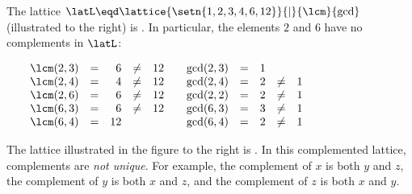 \begin{example}
%
\label{ex:lat_fact12}
The lattice $\latL\eqd\lattice{\setn{1,2,3,4,6,12}}{|}{\lcm}{\gcd}$
(illustrated to the right) is .
In particular,
the elements $2$ and $6$ have no complements in $\latL$:
\\\begin{minipage}[c]{\tw-33mm}
$\begin{array}{@{\qquad}lcrcr @{\qquad} lcrcr}
  \lcm(2,3) &=&  6 &\ne & 12  & \gcd(2,3) &=& 1 &     &    \\
  \lcm(2,4) &=&  4 &\ne & 12  & \gcd(2,4) &=& 2 &\ne & 1  \\
  \lcm(2,6) &=&  6 &\ne & 12  & \gcd(2,2) &=& 2 &\ne & 1  \\
  \lcm(6,3) &=&  6 &\ne & 12  & \gcd(6,3) &=& 3 &\ne & 1  \\
  \lcm(6,4) &=& 12 &     &     & \gcd(6,4) &=& 2 &\ne & 1  \\
\end{array}$
\end{minipage}%
\hfill{}
\end{example}




\begin{minipage}[c]{\tw-26mm}
\begin{example}
\footnotemark
The lattice illustrated in the figure to the right is .
In this complemented lattice, complements are {\em not unique}.
For example, the complement of $x$ is both $y$ and $z$,
the complement of $y$ is both $x$ and $z$,
and the complement of $z$ is both $x$ and $y$.
\end{example}
\end{minipage}%
\hfill{}

